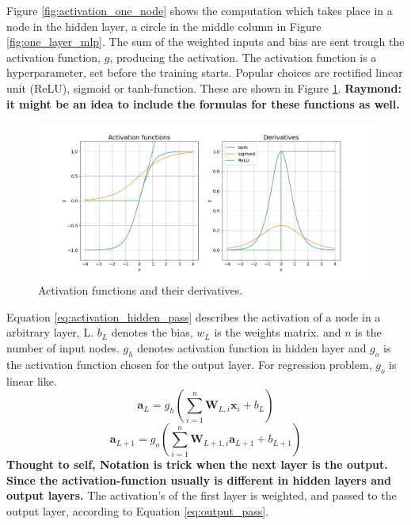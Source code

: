 Figure \ref{fig:activation_one_node} shows the computation which takes place in a node in the hidden layer, a circle in the middle column in Figure \ref{fig:one_layer_mlp}. The sum of the weighted inputs and bias are sent trough the activation function, $g$, producing the activation. The activation function is a hyperparameter, set before the training starts. Popular choices are rectified linear unit (ReLU), sigmoid or tanh-function. These are shown in Figure \ref{fig:activation_function_example}.
\textbf{Raymond: it might be an idea to include the formulas for these functions as well.}
\begin{figure}
    \centering
    \includegraphics[scale = 0.4]{Chapter3_Method/figs/activation_functions_and_derivatives.png}
    \caption{Activation functions and their derivatives.}
    \label{fig:activation_function_example}
\end{figure}
Equation \eqref{eq:activation_hidden_pass} describes the activation of a node in a arbitrary layer, L. $b_L$ denotes the bias, $w_L$ is the weights matrix. and $n$ is the number of input nodes. $g_h$ denotes activation function in hidden layer and $g_o$ is the activation function chosen for the output layer. For regression problem, $g_o$ is linear like.
\begin{equation} \label{eq:activation_hidden_pass}
    \textbf{a}_L = g_h(\sum_{i=1}^n \textbf{W}_{L, i} \textbf{x}_i + b_L)
\end{equation}
\begin{equation} \label{eq:output_pass}
    \textbf{a}_{L+1} = g_o(\sum_{i=1}^n \textbf{W}_{L+1, i} \textbf{a}_{L+1} + b_{L+1})
\end{equation}
\textbf{Thought to self, Notation is trick when the next layer is the output. Since the activation-function usually is different in hidden layers and output layers. }
The activation's of the first layer is weighted, and passed to the output layer, according to Equation \eqref{eq:output_pass}.

